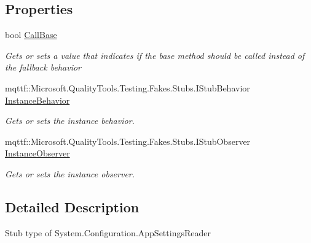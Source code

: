 \subsection*{Properties}
\begin{DoxyCompactItemize}
\item 
bool \hyperlink{class_system_1_1_configuration_1_1_fakes_1_1_stub_app_settings_reader_a5e7b0999ae560216ab1bd7b453e2efcc}{Call\-Base}
\begin{DoxyCompactList}\small\item\em Gets or sets a value that indicates if the base method should be called instead of the fallback behavior\end{DoxyCompactList}\item 
mqttf\-::\-Microsoft.\-Quality\-Tools.\-Testing.\-Fakes.\-Stubs.\-I\-Stub\-Behavior \hyperlink{class_system_1_1_configuration_1_1_fakes_1_1_stub_app_settings_reader_aa322b1c5e878d69070151138e8352c2c}{Instance\-Behavior}
\begin{DoxyCompactList}\small\item\em Gets or sets the instance behavior.\end{DoxyCompactList}\item 
mqttf\-::\-Microsoft.\-Quality\-Tools.\-Testing.\-Fakes.\-Stubs.\-I\-Stub\-Observer \hyperlink{class_system_1_1_configuration_1_1_fakes_1_1_stub_app_settings_reader_ab40906ad397156fa5cc1a6600ff17846}{Instance\-Observer}
\begin{DoxyCompactList}\small\item\em Gets or sets the instance observer.\end{DoxyCompactList}\end{DoxyCompactItemize}


\subsection{Detailed Description}
Stub type of System.\-Configuration.\-App\-Settings\-Reader



